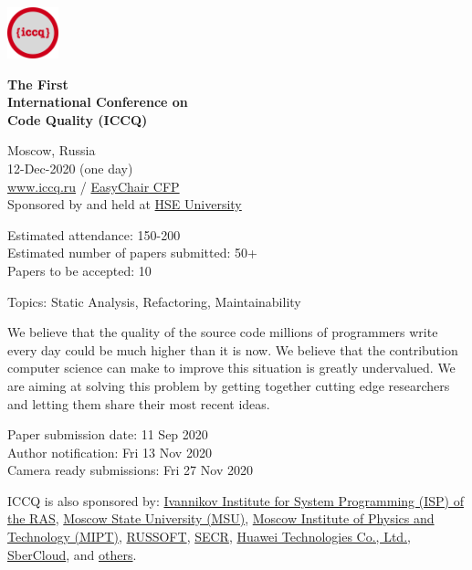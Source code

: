 \documentclass[12pt,oneside]{article}
\begin{document}
\selectfont
\raggedbottom
\raggedright
\setlength{\topskip}{6pt}
\setlength{\parindent}{0pt} %
\setlength{\parskip}{6pt} %

\includegraphics[height=4em]{../logo}

\textcolor{xred}{\bfseries
{\large The First} \\
{\Large International Conference on\\[3pt]
Code Quality (ICCQ)}}

\vspace{6pt}

Moscow, Russia \\
12-Dec-2020 (one day) \\
\href{https://www.iccq.ru}{www.iccq.ru} / \href{https://easychair.org/cfp/ICCQ20}{EasyChair CFP}\\

Sponsored by and held at \href{https://www.hse.ru/en/}{HSE University}

Estimated attendance: 150-200 \\
Estimated number of papers submitted: 50+ \\
Papers to be accepted: 10

\vspace{6pt}

Topics: Static Analysis, Refactoring, Maintainability

We believe that the quality of the source code millions of programmers
write every day could be much higher than it is now. We believe that the
contribution computer science can make to improve this situation is greatly
undervalued. We are aiming at solving this problem by getting
together cutting edge researchers and letting them share their most recent ideas.

\vspace{6pt}

Paper submission date: 11 Sep 2020 \\
Author notification: Fri 13 Nov 2020 \\
Camera ready submissions: Fri 27 Nov 2020

\vspace{6pt}

ICCQ is also sponsored by:
\href{https://www.ispras.ru/en/}{Ivannikov Institute for System Programming (ISP) of the RAS},
\href{https://www.msu.ru/}{Moscow State University (MSU)},
\href{https://mipt.ru/english/}{Moscow Institute of Physics and Technology (MIPT)},
\href{https://russoft.org/en/}{RUSSOFT},
\href{https://2021.secrus.org/?lang=en}{SECR},
\href{https://www.huawei.com}{Huawei Technologies Co., Ltd.},
\href{https://sbercloud.ru/}{SberCloud},
and \href{https://www.iccq.ru/#partners}{others}.
\end{document}
